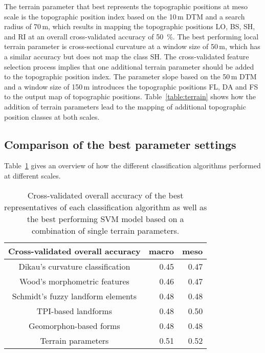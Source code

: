 \documentclass[preprint,12pt,authoryear]{elsarticle}
\begin{document}
The terrain parameter that best represents the topographic positions at meso scale is the topographic position index based on the 10\,m DTM and a search radius of 70\,m, which results in mapping the topographic positions LO, BS, SH, and RI at an overall cross-validated accuracy of 50~\%. The best performing local terrain parameter is cross-sectional curvature at a window size of 50\,m, which has a similar accuracy but does not map the class SH. The cross-validated feature selection process implies that one additional terrain parameter should be added to the topographic position index. The parameter slope based on the 50\,m DTM and a window size of 150\,m introduces the topographic positions FL, DA and FS to the output map of topographic positions. Table~\ref{table:terrain} shows how the addition of terrain parameters lead to the mapping of additional topographic position classes at both scales.

\subsection{Comparison of the best parameter settings}
Table~\ref{table:overall_comparison} gives an overview of how the different classification algorithms performed at different scales.

\begin{table}[ht]
\caption{Cross-validated overall accuracy of the best representatives of each classification algorithm as well as the best performing SVM model based on a combination of single terrain parameters.}
\centering
\begin{tabular}{crr}
  \hline
Cross-validated overall accuracy & macro   & meso \\ 
  \hline 
Dikau's curvature classification & 0.45  & 0.47 \\ 
  Wood's morphometric features & 0.46  & 0.47  \\ 
  Schmidt's fuzzy landform elements & 0.48   & 0.48  \\ 
  TPI-based landforms & 0.48  & 0.50  \\ 
  Geomorphon-based forms & 0.48   & 0.48   \\ 
  Terrain parameters & 0.51  & 0.52   \\ 
   \hline
\end{tabular}
\label{table:overall_comparison}
\end{table}
\end{document}
